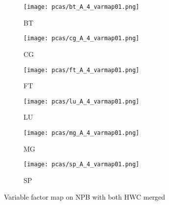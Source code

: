 \begin{figure}
    \label{fig:pca_results}
    \begin{subfigure}[b]{0.45\textwidth}
        \texttt{[image: pcas/bt\_A\_4\_varmap01.png]}
        \caption{BT}
        \label{fig:bt_pcv_hwc1}
    \end{subfigure}
    \quad
    \begin{subfigure}[b]{0.45\textwidth}
        \texttt{[image: pcas/cg\_A\_4\_varmap01.png]}
        \caption{CG}
        \label{fig:cg_pcv_hwc1}
    \end{subfigure}
    
    \begin{subfigure}[b]{0.45\textwidth}
        \texttt{[image: pcas/ft\_A\_4\_varmap01.png]}
        \caption{FT}
        \label{fig:ft_pcv_hwc1}
    \end{subfigure}
    \quad
    \begin{subfigure}[b]{0.45\textwidth}
        \texttt{[image: pcas/lu\_A\_4\_varmap01.png]}
        \caption{LU}
        \label{fig:lu_pcv_hwc1}
    \end{subfigure}

    \begin{subfigure}[b]{0.45\textwidth}
        \texttt{[image: pcas/mg\_A\_4\_varmap01.png]}
        \caption{MG}
        \label{fig:mg_pcv_hwc1}
    \end{subfigure}
    \quad
    \begin{subfigure}[b]{0.45\textwidth}
        \texttt{[image: pcas/sp\_A\_4\_varmap01.png]}
        \caption{SP}
        \label{fig:sp_pcv_hwc1}
    \end{subfigure}
    \caption{Variable factor map on NPB with both HWC merged}
\end{figure}


